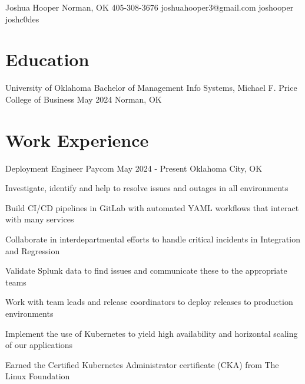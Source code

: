 \documentclass[letterpaper]{resumeconfig}
\begin{document}
\Header
    {Joshua Hooper} %
    {Norman, OK} %
    {405-308-3676} %
    {joshuahooper3@gmail.com} %
    {joshooper} %
    {joshc0des} %


\section{Education}

\Education
    {University of Oklahoma} %
    {Bachelor of Management Info Systems, Michael F. Price College of Business} %
    {May 2024} %
    {Norman, OK} %
    \vspace{-1em}


\section{Work Experience}

\WorkExperience
	{Deployment Engineer} %
	{Paycom} %
	{May 2024 - Present} %
	{Oklahoma City, OK} %
	{
		\item Investigate, identify and help to resolve issues and outages in all environments
		\item Build CI/CD pipelines in GitLab with automated YAML workflows that interact with many services
		\item Collaborate in interdepartmental efforts to handle critical incidents in Integration and Regression
		\item Validate Splunk data to find issues and communicate these to the appropriate teams
		\item Work with team leads and release coordinators to deploy releases to production environments
		\item Implement the use of Kubernetes to yield high availability and horizontal scaling of our applications
		\item Earned the Certified Kubernetes Administrator certificate (CKA) from The Linux Foundation
	}
	\vspace{1em}
\end{document}
